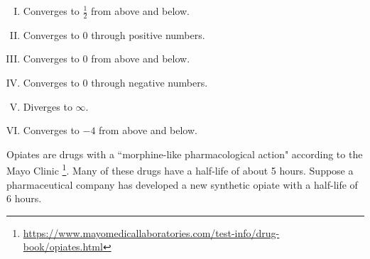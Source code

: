 \begin{questions}
\begin{parts}
\end{parts}

\begin{enumerate}[I.]
\item \numanswerline[D] Converges to $\frac{1}{2}$ from above and below.\vfill

\item \numanswerline[A] Converges to $0$ through positive numbers.\vfill

\item \numanswerline[B] Converges to $0$ from above and below.\vfill

\item \numanswerline[F] Converges to 0 through negative numbers.\vfill

\item \numanswerline[E] Diverges to $\infty$.\vfill

\item \numanswerline[C] Converges to $-4$ from above and below.\vfill
\end{enumerate}

\newpage

\question Opiates are drugs with a ``morphine-like pharmacological action" according to the Mayo Clinic \footnote{\url{https://www.mayomedicallaboratories.com/test-info/drug-book/opiates.html}}. Many of these drugs have a half-life of about 5 hours. Suppose a pharmaceutical company has developed a new synthetic opiate with a half-life of 6 hours.
\end{questions}
